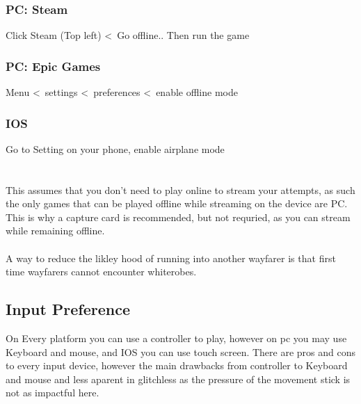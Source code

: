 \subsubsection{PC: Steam}
Click Steam (Top left) \textless\ Go offline.. Then run the game

\subsubsection{PC: Epic Games}
Menu \textless\ settings \textless\ preferences \textless\ enable offline mode

\subsubsection{IOS}
Go to Setting on your phone, enable airplane mode\\
\\
\\
This assumes that you don't need to play online to stream your attempts, as such the only games that can be played offline 
while streaming on the device are PC. This is why a capture card is recommended, but not requried, as you can stream while 
remaining offline. \\
\\
A way to reduce the likley hood of running into another wayfarer is that first time wayfarers cannot encounter 
whiterobes.


\subsection*{Input Preference}

On Every platform you can use a controller to play, however on pc you may use Keyboard and mouse, and IOS you can use 
touch screen. There are pros and cons to every input device, however the main drawbacks from controller to Keyboard
and mouse and less aparent in glitchless as the pressure of the movement stick is not as impactful here.

\newpage